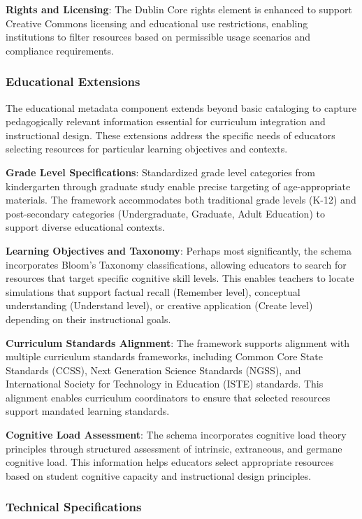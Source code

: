 \textbf{Rights and Licensing}: The Dublin Core rights element is enhanced to support Creative Commons licensing and educational use restrictions, enabling institutions to filter resources based on permissible usage scenarios and compliance requirements.

\subsubsection{Educational Extensions}

The educational metadata component extends beyond basic cataloging to capture pedagogically relevant information essential for curriculum integration and instructional design. These extensions address the specific needs of educators selecting resources for particular learning objectives and contexts.

\textbf{Grade Level Specifications}: Standardized grade level categories from kindergarten through graduate study enable precise targeting of age-appropriate materials. The framework accommodates both traditional grade levels (K-12) and post-secondary categories (Undergraduate, Graduate, Adult Education) to support diverse educational contexts.

\textbf{Learning Objectives and Taxonomy}: Perhaps most significantly, the schema incorporates Bloom's Taxonomy classifications, allowing educators to search for resources that target specific cognitive skill levels. This enables teachers to locate simulations that support factual recall (Remember level), conceptual understanding (Understand level), or creative application (Create level) depending on their instructional goals.

\textbf{Curriculum Standards Alignment}: The framework supports alignment with multiple curriculum standards frameworks, including Common Core State Standards (CCSS), Next Generation Science Standards (NGSS), and International Society for Technology in Education (ISTE) standards. This alignment enables curriculum coordinators to ensure that selected resources support mandated learning standards.

\textbf{Cognitive Load Assessment}: The schema incorporates cognitive load theory principles through structured assessment of intrinsic, extraneous, and germane cognitive load. This information helps educators select appropriate resources based on student cognitive capacity and instructional design principles.

\subsubsection{Technical Specifications}

